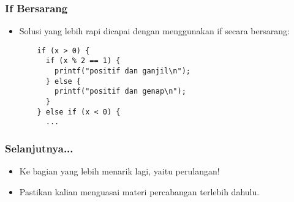 \begin{frame}[fragile]
\frametitle{If Bersarang}
\begin{itemize}
  \item Solusi yang lebih rapi dicapai dengan menggunakan if secara bersarang:
  \begin{lstlisting}
    if (x > 0) {
      if (x % 2 == 1) {
        printf("positif dan ganjil\n");
      } else {
        printf("positif dan genap\n");
      }
    } else if (x < 0) {
      ...
  \end{lstlisting}
\end{itemize}
\end{frame}

\begin{frame}
\frametitle{Selanjutnya...}
\begin{itemize}
  \item Ke bagian yang lebih menarik lagi, yaitu perulangan!
  \item Pastikan kalian menguasai materi percabangan terlebih dahulu.
\end{itemize}
\end{frame}


